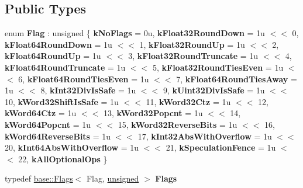 \subsection*{Public Types}
\begin{DoxyCompactItemize}
\item 
\mbox{\label{classv8_1_1internal_1_1compiler_1_1MachineOperatorBuilder_a95ac98a3d73747db21e0d99d42f1f3ca}} 
enum {\bfseries Flag} \+: unsigned \{ \newline
{\bfseries k\+No\+Flags} = 0u, 
{\bfseries k\+Float32\+Round\+Down} = 1u $<$$<$ 0, 
{\bfseries k\+Float64\+Round\+Down} = 1u $<$$<$ 1, 
{\bfseries k\+Float32\+Round\+Up} = 1u $<$$<$ 2, 
\newline
{\bfseries k\+Float64\+Round\+Up} = 1u $<$$<$ 3, 
{\bfseries k\+Float32\+Round\+Truncate} = 1u $<$$<$ 4, 
{\bfseries k\+Float64\+Round\+Truncate} = 1u $<$$<$ 5, 
{\bfseries k\+Float32\+Round\+Ties\+Even} = 1u $<$$<$ 6, 
\newline
{\bfseries k\+Float64\+Round\+Ties\+Even} = 1u $<$$<$ 7, 
{\bfseries k\+Float64\+Round\+Ties\+Away} = 1u $<$$<$ 8, 
{\bfseries k\+Int32\+Div\+Is\+Safe} = 1u $<$$<$ 9, 
{\bfseries k\+Uint32\+Div\+Is\+Safe} = 1u $<$$<$ 10, 
\newline
{\bfseries k\+Word32\+Shift\+Is\+Safe} = 1u $<$$<$ 11, 
{\bfseries k\+Word32\+Ctz} = 1u $<$$<$ 12, 
{\bfseries k\+Word64\+Ctz} = 1u $<$$<$ 13, 
{\bfseries k\+Word32\+Popcnt} = 1u $<$$<$ 14, 
\newline
{\bfseries k\+Word64\+Popcnt} = 1u $<$$<$ 15, 
{\bfseries k\+Word32\+Reverse\+Bits} = 1u $<$$<$ 16, 
{\bfseries k\+Word64\+Reverse\+Bits} = 1u $<$$<$ 17, 
{\bfseries k\+Int32\+Abs\+With\+Overflow} = 1u $<$$<$ 20, 
\newline
{\bfseries k\+Int64\+Abs\+With\+Overflow} = 1u $<$$<$ 21, 
{\bfseries k\+Speculation\+Fence} = 1u $<$$<$ 22, 
{\bfseries k\+All\+Optional\+Ops}
 \}
\item 
\mbox{\label{classv8_1_1internal_1_1compiler_1_1MachineOperatorBuilder_aaa2c15070c17a7bb8bb646ed2a9112fa}} 
typedef \mbox{\hyperlink{classv8_1_1base_1_1Flags}{base\+::\+Flags}}$<$ Flag, \mbox{\hyperlink{classunsigned}{unsigned}} $>$ {\bfseries Flags}
\end{DoxyCompactItemize}
